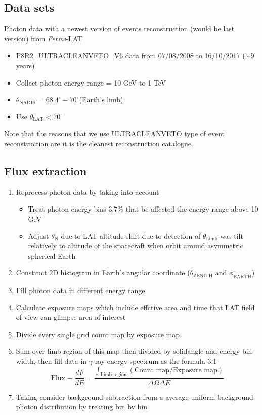 \subsection{Data sets}
Photon data with a newest version of events reconstruction (would be last version) from \textit{Fermi}-LAT
\begin{itemize}
    \item P8R2\_ULTRACLEANVETO\_V6 data from 07/08/2008 to 16/10/2017 ($\sim$9 years)
    \item Collect photon energy range = 10 GeV to 1 TeV
    \item $\theta_{\text{NADIR}} = 68.4^\circ - 70^\circ$(Earth’s limb) 
    \item Use $\theta_{\text{LAT}} < 70^\circ$
\end{itemize}
Note that the reasons that we use ULTRACLEANVETO type of event reconstruction are it is the cleanest reconstruction catalogue.

\subsection{Flux extraction}
\begin{enumerate}
    \item Reprocess photon data by taking into account
        \begin{itemize}
            \item Treat photon energy bias 3.7\% that be affected the energy range above 10 GeV
            \item Adjust $\theta_\text{N}$ due to LAT altitude shift due to detection of $\theta_{\text{Limb}}$ was tilt relatively to altitude of the spacecraft when orbit around asymmetric spherical Earth 
        \end{itemize}
    \item Construct 2D histogram in Earth's angular coordinate ($\theta_{\text{ZENITH}}$ and $\phi_{\text{EARTH}}$)
    \item Fill photon data in different energy range
    \item Calculate exposure maps which include effctive area and time that LAT field of view can glimpse area of interest
    \item Divide every single grid count map by exposure map
    \item Sum over limb region of this map then divided by solidangle and energy bin width, then fill data in $\gamma$-ray energy spectrum as the formula 3.1
    \begin{equation}
        \text{Flux}\equiv\frac{dF}{dE} = \frac{\int_{\text{Limb region}} (\text{Count map}/\text{Exposure map})}{\Delta\Omega\Delta E}
    \end{equation}
    \item Taking consider background subtraction from a average uniform background photon distribution by treating bin by bin 
\end{enumerate}


